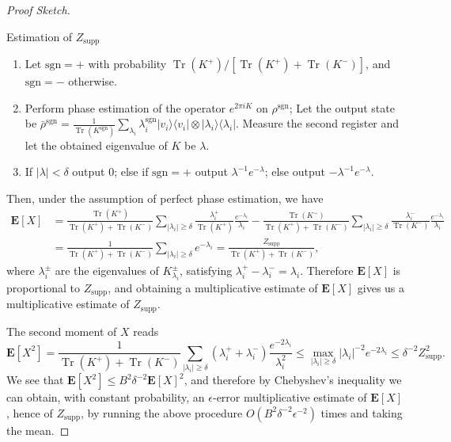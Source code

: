 \documentclass[a4paper,UKenglish,cleveref, autoref]{lipics-v2019}
\theoremstyle{remark}
\numberwithin{equation}{section}
\numberwithin{oracle}{section}
\numberwithin{remark}{section}
\newcommand{\ket}[1]{|#1\rangle}
\newcommand{\bra}[1]{\langle#1|}
\newcommand{\E}{\mathbf{E}}
\DeclareMathOperator{\tr}{Tr}
\begin{document}
\begin{proof}[Proof Sketch]
\begin{algorithm}[H]
\caption{Estimation of $Z_{\text{supp}}$}
 \label{algo:Zsupp}
\begin{enumerate}
\item Let $\text{sgn} = +$ with probability $\tr(K^+)/[\tr(K^+)+\tr(K^-)]$, and $\text{sgn} = -$ otherwise.
\item Perform phase estimation of the operator $e^{2 \pi iK}$ on $\rho^{\text{sgn}}$; Let the output state be $\bar{\rho}^{\text{sgn}}=\frac{1}{ \tr(K^{\text{sgn}})}\sum_{\lambda_i} \lambda^{\text{sgn}}_i \ket{v_i}\bra{v_i}\otimes\ket{\lambda_i}\bra{\lambda_i}$. Measure the second register and let the obtained eigenvalue of $K$ be $\lambda$.
\item If $|\lambda| < \delta$ output 0; else if $\text{sgn}=+$ output $\lambda^{-1}e^{-\lambda}$; else output $-\lambda^{-1}e^{-\lambda}$.
\end{enumerate}
\end{algorithm}
Then, under the assumption of perfect phase estimation, we have
\begin{align}
\E[X] &=  \frac{\tr(K^+)}{\tr(K^+)+\tr(K^-)}\sum_{|\lambda_i| \ge \delta} \frac{\lambda_i^+}{\tr(K^+)} \frac{e^{-\lambda_i}}{\lambda_i}-\frac{\tr(K^-)}{\tr(K^+)+\tr(K^-)}\sum_{|\lambda_i| \ge \delta} \frac{\lambda_i^-}{\tr(K^-)} \frac{e^{-\lambda_i}}{\lambda_i} \nonumber\\ &=\frac{1}{\tr(K^+)+\tr(K^-)}\sum_{|\lambda_i| \ge \delta} e^{-\lambda_i} = \frac{Z_{\text{supp}}}{\tr(K^+)+\tr(K^-)},
\end{align}
where $\lambda_i^\pm$ are the eigenvalues of  $K^\pm_{\lambda_i}$, satisfying $\lambda_i^+ - \lambda_i^-=\lambda_i$. Therefore $\E[X]$ is proportional to $Z_{\text{supp}}$, and obtaining a multiplicative estimate of $\E[X]$ gives us a multiplicative estimate of $Z_{\text{supp}}$.

The second moment of $X$ reads
\begin{equation}
\E[X^2] =\frac{1}{\tr(K^+)+\tr(K^-)}\sum_{|\lambda_i| \ge \delta} (\lambda_i^+ + \lambda_i^-) \frac{e^{-2\lambda_i}}{\lambda_i^2}\le \max_{|\lambda_i| \ge \delta} |\lambda_i|^{-2} e^{-2\lambda_i} \le \delta^{-2} Z^2_{\text{supp}}.
\end{equation}
 We see that $\E[X^2] \le B^2\delta^{-2} \E[X]^2$, and therefore by Chebyshev's inequality we can obtain, with constant probability, an $\epsilon$-error multiplicative estimate of $\E[X]$, hence of $Z_{\text{supp}}$, by running the above procedure $O(B^2\delta^{-2}\epsilon^{-2})$ times and taking the mean.


\end{proof}
\end{document}
